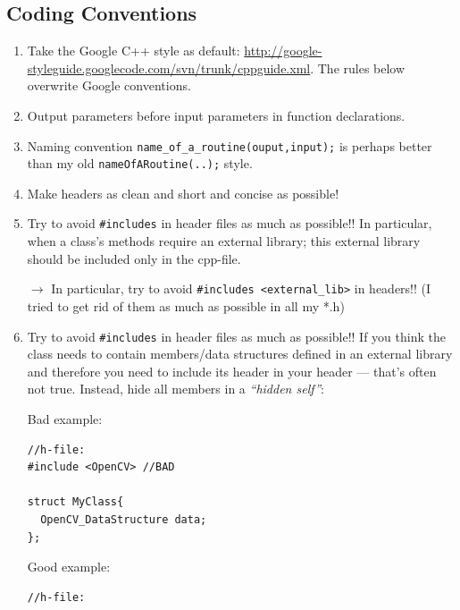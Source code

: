 
\subsection{Coding Conventions}

\begin{enumerate}
\item Take the Google C++ style as default:
  \url{http://google-styleguide.googlecode.com/svn/trunk/cppguide.xml}.
  The rules below overwrite Google conventions.

\item Output parameters before input parameters in function declarations.

\item Naming convention \verb+name_of_a_routine(ouput,input);+ is
  perhaps better than my old \verb+nameOfARoutine(..);+ style.

\item Make headers as clean and short and concise as possible!

\item Try to avoid \verb+#includes+ in header files as much as possible!!
  In particular, when a class's methods require an external library;
  this external library should be included only in the cpp-file.

 $\to$ In particular, try to avoid \verb+#includes <external_lib>+ in headers!! (I
 tried to get rid of them as much as possible in all my *.h)

\item Try to avoid \verb+#includes+ in header files as much as possible!!
  If
  you think the class needs to contain members/data structures defined
  in an external library and therefore you need to include its header
  in your header --- that's often not true. Instead, hide all members
  in a \emph{``hidden self''}:

Bad example:

\begin{code}
\begin{verbatim}
//h-file:
#include <OpenCV> //BAD

struct MyClass{
  OpenCV_DataStructure data;
};
\end{verbatim}
\end{code}

Good example:

\begin{code}
\begin{verbatim}
//h-file:


\end{verbatim}
\end{code}
\end{enumerate}
